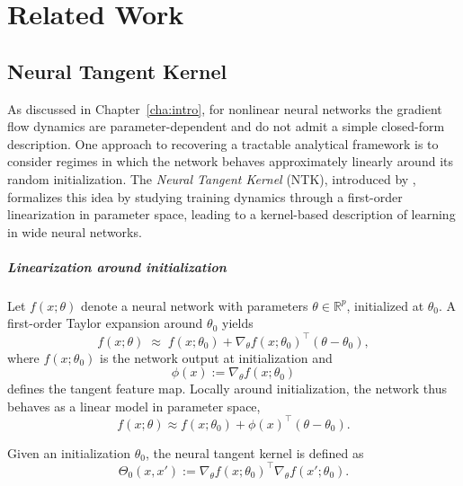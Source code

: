 \chapter{Related Work}\label{cha:related}

\section{Neural Tangent Kernel}\label{sec:ntk}

As discussed in Chapter~\ref{cha:intro}, for nonlinear neural networks the
gradient flow dynamics are parameter-dependent and do not admit a simple
closed-form description. One approach to recovering a tractable analytical
framework is to consider regimes in which the network behaves approximately
linearly around its random initialization. The \emph{Neural Tangent Kernel}
(NTK), introduced by \citet{jacot2018ntk}, formalizes this idea by studying
training dynamics through a first-order linearization in parameter space,
leading to a kernel-based description of learning in wide neural networks.

\paragraph{Linearization around initialization}

Let $f(x;\theta)$ denote a neural network with parameters
$\theta \in \mathbb{R}^p$, initialized at $\theta_0$. A first-order Taylor
expansion around $\theta_0$ yields
\begin{equation}
	f(x;\theta)
	\;\approx\;
	f(x;\theta_0)
	+
	\nabla_\theta f(x;\theta_0)^\top (\theta - \theta_0),
	\label{eq:ntk-linearization}
\end{equation}
where $f(x;\theta_0)$ is the network output at initialization and
\[
	\phi(x) := \nabla_\theta f(x;\theta_0)
\]
defines the tangent feature map. Locally around initialization, the network
thus behaves as a linear model in parameter space,
\begin{equation}
	f(x;\theta) \approx f(x;\theta_0) + \phi(x)^\top (\theta - \theta_0).
	\label{eq:ntk-linear-model}
\end{equation}

\begin{definition}
	Given an initialization $\theta_0$, the neural tangent kernel is defined as
	\[
		\Theta_0(x,x')
		:= \nabla_\theta f(x;\theta_0)^\top
		\nabla_\theta f(x';\theta_0).
	\]
\end{definition}

